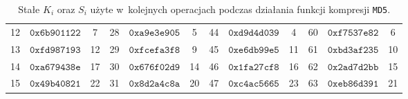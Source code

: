 \begin{table}[htb]
{\begin{tabular}{ |c|c|c|| c|c|c|| c|c|c|| c|c|c| }
        12 & $\mathtt{0x6b901122}$ & 7 & 28 & $\mathtt{0xa9e3e905}$ & 5 & 44 & $\mathtt{0xd9d4d039}$ & 4 & 60 & $\mathtt{0xf7537e82}$ & 6 \\
        13 & $\mathtt{0xfd987193}$ & 12 & 29 & $\mathtt{0xfcefa3f8}$ & 9 & 45 & $\mathtt{0xe6db99e5}$ & 11 & 61 & $\mathtt{0xbd3af235}$ & 10 \\
        14 & $\mathtt{0xa679438e}$ & 17 & 30 & $\mathtt{0x676f02d9}$ & 14 & 46 & $\mathtt{0x1fa27cf8}$ & 16 & 62 & $\mathtt{0x2ad7d2bb}$ & 15 \\
        15 & $\mathtt{0x49b40821}$ & 22 & 31 & $\mathtt{0x8d2a4c8a}$ & 20 & 47 & $\mathtt{0xc4ac5665}$ & 23 & 63 & $\mathtt{0xeb86d391}$ & 21 \\
        \hline
    \end{tabular}
    }
    \caption{Stałe $K_i$ oraz $S_i$ użyte w~kolejnych operacjach
    podczas działania funkcji kompresji \texttt{MD5}.}
    \label{tbl:md5_operation_const}
\end{table}

